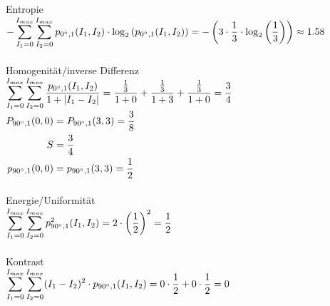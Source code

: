 \begin{enumerate}[I]
	      Entropie\\
	      $\begin{aligned}[t]
			      -  \sum_{I_1=0}^{I_{max}}\sum_{I_2=0}^{I_{max}}  p_{0\degree,1}(I_1,I_2) \cdot \log_2 \left( p_{0\degree,1}(I_1,I_2) \right)
			      =- \left(3 \cdot \frac{1}{3} \cdot \log_2\left(\frac{1}{3}\right) \right) \approx 1.58 \\
		      \end{aligned}$\\\\

	      Homogenität/inverse Differenz\\
	      $\begin{aligned}[t]
			      \sum_{I_1=0}^{I_{max}}\sum_{I_2=0}^{I_{max}}  \frac{p_{0\degree,1}(I_1,I_2)}{1 + |I_1-I_2|}
			      = \frac{\frac{1}{3}}{1 + 0} + \frac{\frac{1}{3}}{1 + 3}  + \frac{\frac{1}{3}}{1 + 0}  = \frac{3}{4} \\
		      \end{aligned}$
	      \newpage
	      $\begin{aligned}[t]
			      P_{90\degree,1}(0,0) & =
			      P_{90\degree,1}(3,3)  = \frac{3}{8}  \\
			      S                    & = \frac{3}{4} \\
			      p_{90\degree,1}(0,0) & =
			      p_{90\degree,1}(3,3)  = \frac{1}{2}  \\
		      \end{aligned}$\\\\

	      Energie/Uniformität\\
	      $\begin{aligned}[t]
			      \sum_{I_1=0}^{I_{max}}\sum_{I_2=0}^{I_{max}} p^2_{90\degree,1}(I_1,I_2)
			      = 2\cdot \left(\frac{1}{2}\right)^2 = \frac{1}{2} \\
		      \end{aligned}$\\\\

	      Kontrast\\
	      $\begin{aligned}[t]
			      \sum_{I_1=0}^{I_{max}}\sum_{I_2=0}^{I_{max}} (I_1-I_2)^2 \cdot p_{90\degree,1}(I_1,I_2)
			      =0 \cdot \frac{1}{2} + 0 \cdot \frac{1}{2} = 0 \\
		      \end{aligned}$\\\\


\end{enumerate}
